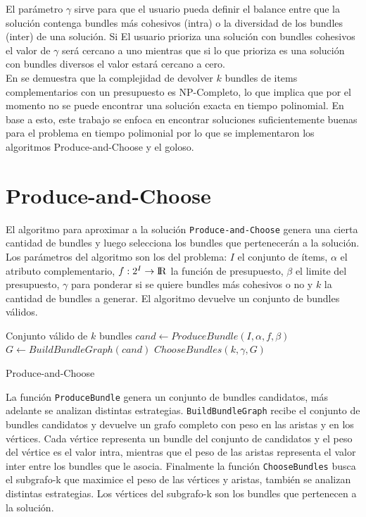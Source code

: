 El parámetro $\gamma$ sirve para que el usuario pueda definir el balance entre que la solución contenga bundles más cohesivos (intra) o la diversidad de los bundles (inter) de una solución. Si El usuario prioriza una solución con bundles cohesivos el valor de $\gamma$ será cercano a uno mientras que si lo que prioriza es una solución con bundles diversos el valor estará cercano a cero.\\
En \cite{compositeRetrival} se demuestra que la complejidad de devolver $k$ bundles de items complementarios con un presupuesto es NP-Completo, lo que implica que por el momento no se puede encontrar una solución exacta en tiempo polinomial. En base a esto, este trabajo se enfoca en encontrar soluciones suficientemente buenas para el problema en tiempo polimonial por lo que se implementaron los algoritmos Produce-and-Choose y el goloso.

\section{Produce-and-Choose}
El algoritmo para aproximar a la solución \texttt{Produce-and-Choose} genera una cierta cantidad de bundles y luego selecciona los bundles que pertenecerán a la solución.\\

Los parámetros del algoritmo son los del problema: $I$ el conjunto de ítems, $\alpha$ el atributo complementario, $f: 2^{I} \rightarrow \rm I \!R$ la función de presupuesto, $\beta$ el limite del presupuesto, $\gamma$ para ponderar si se quiere bundles más cohesivos o no y $k$ la cantidad de bundles a generar. El algoritmo devuelve un conjunto de bundles válidos.\\
\begin{algorithm}[H]
\begin{algorithmic}[1]
\ENSURE Conjunto válido de $k$ bundles
\STATE $cand \leftarrow ProduceBundle(I,\alpha,f,\beta)$
\STATE $G \leftarrow BuildBundleGraph(cand)$
\RETURN $ChooseBundles(k,\gamma,G)$
\end{algorithmic}
\caption{Produce-and-Choose}\label{alg:PAC}
\end{algorithm}

La función \texttt{ProduceBundle} genera un conjunto de bundles candidatos, más adelante se analizan distintas estrategias. \texttt{BuildBundleGraph} recibe el conjunto de bundles candidatos y devuelve un grafo completo con peso en las aristas y en los vértices. Cada vértice representa un bundle del conjunto de candidatos y el peso del vértice es el valor intra, mientras que el peso de las aristas representa el valor inter entre los bundles que le asocia. Finalmente la función \texttt{ChooseBundles} busca el subgrafo-k que maximice el peso de las vértices y aristas, también se analizan distintas estrategias. Los vértices del subgrafo-k son los bundles que pertenecen a la solución.

